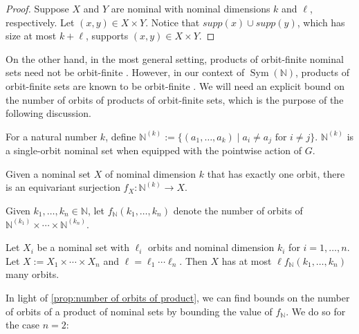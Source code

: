 \documentclass[runningheads]{llncs}
\newcommand{\bb}{\mathbb}
\DeclareMathOperator{\Sym}{Sym}
\newif\ifappendix
\begin{document}
\begin{proof}
    Suppose $X$ and $Y$ are nominal with nominal dimensions $k$ and $\ell$, respectively. 
    Let $(x,y) \in X \times Y$.
    Notice that $supp(x) \cup supp(y)$, which has size at most $k + \ell$, supports $(x,y) \in X \times Y$.
\end{proof}

On the other hand, in the most general setting, products of orbit-finite nominal sets need not be orbit-finite \cite[Example 2.5]{bojanczyk-klin-lasota:automata-theory-in-nominal-sets}.
However, in our context of $\Sym(\bb N)$, products of orbit-finite sets are known to be orbit-finite \cite[Section 10]{bojanczyk-klin-lasota:automata-theory-in-nominal-sets}. 
We will need an explicit bound on the number of orbits of products of orbit-finite sets, which is the purpose of the following discussion.

For a natural number $k$, define $\bb N^{(k)} := \{(a_1, \ldots, a_k) \mid a_i \neq a_j \text{ for } i \neq j\}$.
$\bb N^{(k)}$ is a single-orbit nominal set when equipped with the pointwise action of $G$.

\begin{lemma} \label{lem:single orbit set is surjective image of N^(k)}
    Given a nominal set $X$ of nominal dimension $k$ that has exactly one orbit, there is an equivariant surjection $f_X : \bb N^{(k)} \to X$.
\end{lemma}

\begin{definition}
    Given $k_1, \ldots, k_n \in \bb N$, let $f_{\bb N}(k_1, \ldots, k_n)$ denote the number of orbits of $\bb N^{(k_1)} \times \cdots \times \bb N^{(k_n)}$. 
\end{definition}

\begin{proposition}\label{prop:number of orbits of product}
    Let $X_i$ be a nominal set with $\ell_i$ orbits and nominal dimension $k_i$ for $i=1, \ldots, n$.
    Let $X := X_1 \times \cdots \times X_n$ and $\ell = \ell_1 \cdots \ell_n$. Then $X$ has at most $\ell f_{\bb N}(k_1, \ldots, k_n)$ many orbits.
\end{proposition}

\ifappendix \autoref{prop:number of orbits of product} is stated but not proven in \cite{moerman-etal:learning-nominal-automata}. For completeness, we include a proof in Appendix \ref{appendix:proof of number of orbits of product}. \fi
In light of \autoref{prop:number of orbits of product}, we can find bounds on the number of orbits of a product of nominal sets by bounding the value of $f_{\bb N}$.
We do so for the case $n=2$:
\end{document}
